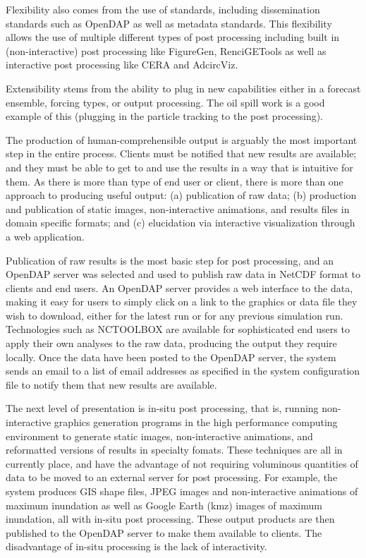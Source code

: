 \documentclass[12pt]{article}
\begin{document}
Flexibility also comes from the use of standards, including 
dissemination standards such as OpenDAP as well as metadata 
standards. This flexibility allows the use of multiple different 
types of post processing including built in (non-interactive) post 
processing like FigureGen, RenciGETools as well as interactive post 
processing like CERA and AdcircViz.

Extensibility stems from the ability to plug in new capabilities
either in a forecast ensemble, forcing types, or output processing.
The oil spill work is a good example of this (plugging in the 
particle tracking to the post processing). 

The production of human-comprehensible output is arguably the most 
important step in the entire process. Clients must be notified that 
new results are available; and they must be able to get to and use 
the results in a way that is  intuitive for them. As there is more 
than type of end user or client, there is more than one approach to 
producing useful output: (a) publication of raw data; (b) production 
and publication of static images, non-interactive animations, and 
results files in domain specific formats; and (c) elucidation via 
interactive visualization through a web application.

Publication of raw results is the most basic step for post 
processing, and an OpenDAP server was selected and used to publish 
raw data in NetCDF format to clients and end users. An OpenDAP 
server provides a web interface to the data, making it easy for 
users to simply click on a link to the graphics or data file they 
wish to download, either for the latest run or for any previous 
simulation run.  Technologies such as NCTOOLBOX are available for 
sophisticated end users to apply their own analyses to the raw data, 
producing the output they require locally.  Once the data have been 
posted to the OpenDAP server, the system sends an email to a list of 
email addresses as specified in the system configuration file to 
notify them that new results are available. 

The next level of presentation is in-situ post processing, that is, 
running non-interactive graphics generation programs in the high 
performance computing environment to generate static images, 
non-interactive animations, and reformatted versions of results in 
specialty fomats. These techniques are all in currently place, and 
have the advantage of not requiring voluminous quantities of data to 
be moved to an external server for post processing. For example, the 
system produces GIS shape files, JPEG images and non-interactive 
animations of maximum inundation as well as Google Earth (kmz) 
images of maximum inundation, all with in-situ post processing. 
These output products are then published to the OpenDAP server to 
make them available to clients. The disadvantage of in-situ 
processing is the lack of interactivity. 
\end{document}
